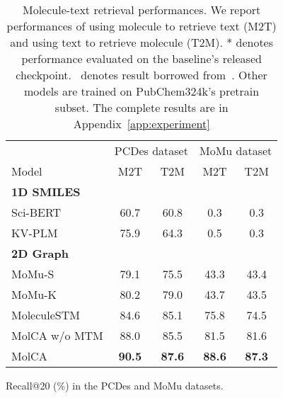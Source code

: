 \documentclass[11pt]{article}
\begin{document}
\begin{table}[t!]
\begin{subtable}[t]{0.45\textwidth}
        \small
        \centering
        \begin{tabular}{lcccc} \toprule
                & \multicolumn{2}{c}{PCDes dataset}           & \multicolumn{2}{c}{MoMu dataset}            \\
\cmidrule(lr){2-3} \cmidrule(lr){4-5}
        Model              & M2T                  & T2M                  & M2T                  & T2M                  \\\midrule
        \textbf{1D SMILES} & \multicolumn{1}{l}{} & \multicolumn{1}{l}{} & \multicolumn{1}{l}{} & \multicolumn{1}{l}{} \\
        Sci-BERT           & 60.7                 & 60.8                 & 0.3                  & 0.3                  \\
        KV-PLM             & 75.9                 & 64.3                 & 0.5                  & 0.3                  \\\midrule
        \textbf{2D Graph}  & \multicolumn{1}{l}{} & \multicolumn{1}{l}{} & \multicolumn{1}{l}{} & \multicolumn{1}{l}{} \\
        MoMu-S             & 79.1                 & 75.5                 & 43.3                 & 43.4                 \\
        MoMu-K             & 80.2                 & 79.0                 & 43.7                 & 43.5                 \\
        MoleculeSTM       & 84.6                 & 85.1                 & 75.8                 & 74.5                 \\
        MolCA w/o MTM      & 88.0                 & 85.5                 & 81.5                 & 81.6                 \\
        MolCA              & \textbf{90.5}        & \textbf{87.6}        & \textbf{88.6}        & \textbf{87.3}       \\\bottomrule
        \end{tabular}
        \caption{Recall@20 (\%) in the PCDes and MoMu datasets. }
        \label{tab:retrieval_twoothers}
    \end{subtable}
    \caption{Molecule-text retrieval performances. We report performances of using molecule to retrieve text (M2T) and using text to retrieve molecule (T2M). * denotes performance evaluated on the baseline's released checkpoint. \dag ~denotes result borrowed from~\citep{MoMu}. Other models are trained on PubChem324k's pretrain subset. The complete results are in Appendix~\ref{app:experiment}}
    \label{tab:retrieval}
 \vspace{-4mm}
    \end{table}
\end{document}
